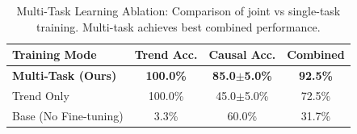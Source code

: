 
\begin{table}[t]
\centering
\caption{Multi-Task Learning Ablation: Comparison of joint vs single-task training.
Multi-task achieves best combined performance.}
\label{tab:multitask_ablation}
\begin{tabular}{l c c c}
\toprule
\textbf{Training Mode} & \textbf{Trend Acc.} & \textbf{Causal Acc.} & \textbf{Combined} \\
\midrule
\textbf{Multi-Task (Ours)} & \textbf{100.0\%} & \textbf{85.0$\pm$5.0\%} & \textbf{92.5\%} \\
Trend Only & 100.0\% & 45.0$\pm$5.0\% & 72.5\% \\
Base (No Fine-tuning) & 3.3\% & 60.0\% & 31.7\% \\

\bottomrule
\end{tabular}
\end{table}
